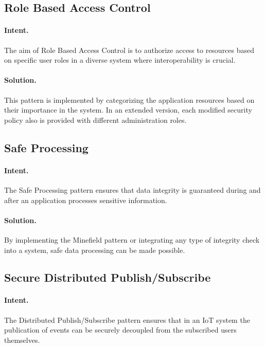 \subsection{Role Based Access Control~\cite{Ali2018}} 
\label{p:rbac}

\paragraph{\textbf{Intent.}} The aim of Role Based Access Control is to authorize access to resources based on specific user roles in a diverse system where interoperability is crucial.

\paragraph{\textbf{Solution.}} This pattern is implemented by categorizing the application resources based on their importance in the system. In an extended version, each modified security policy also is provided with different administration roles.


\subsection{Safe Processing~\cite{Papoutsakis2021}} 
\label{p:sp}

\paragraph{\textbf{Intent.}} The Safe Processing pattern ensures that data integrity is guaranteed during and after an application processes sensitive information.

\paragraph{\textbf{Solution.}} By implementing the Minefield pattern or integrating any type of integrity check into a system, safe data processing can be made possible.


\subsection{Secure Distributed Publish/Subscribe~\cite{Fernandez20202}} 
\label{p:sdps}

\paragraph{\textbf{Intent.}} The Distributed Publish/Subscribe pattern ensures that in an IoT system the publication of events can be securely decoupled from the subscribed users themselves.

